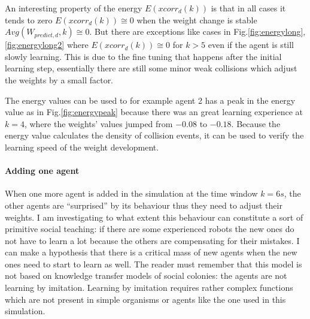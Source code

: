 An interesting property of the energy $E(xcorr_{d}(k))$ is that in all cases it tends
to zero $E(xcorr_{d}(k)) \cong 0$ when the weight change is stable $Avg(W_{predict,d},k) \cong 0$.
But there are exceptions like cases in Fig.\ref{fig:energylong},\ref{fig:energylong2}
where $E(xcorr_{d}(k)) \cong 0$ for $k>5$ even if the agent is still slowly learning.
This is due to the fine tuning that happens after the initial learning step, essentially
there are still some minor weak collisions which adjust the weights by a small factor.

The energy values can be used to for example agent 2 has a peak in the energy value
as in Fig.\ref{fig:energypeak} because there was an great learning experience at $k=4$,
where the weights' values jumped from $-0.08$ to $-0.18$.
Because the energy value calculates the density of collision events, it can be used
to verify the learning speed of the weight development.

\paragraph{Adding one agent}
When one more agent is added in the simulation at the time window $k=6 s$,
the other agents are ``surprised'' by its behaviour thus they need to adjust their weights.
I am investigating to what extent this behaviour can constitute a sort of primitive social teaching:
if there are some experienced robots the new ones do not have to learn a lot because the others are
compensating for their mistakes.
I can make a hypothesis that there is a critical mass of new agents
when the new ones need to start to learn as well.
The reader must remember that this model is not based on knowledge transfer models of
social colonies: the agents are not learning by imitation.
Learning by imitation requires rather complex functions which are not present in
simple organisms or agents like the one used in this simulation.

